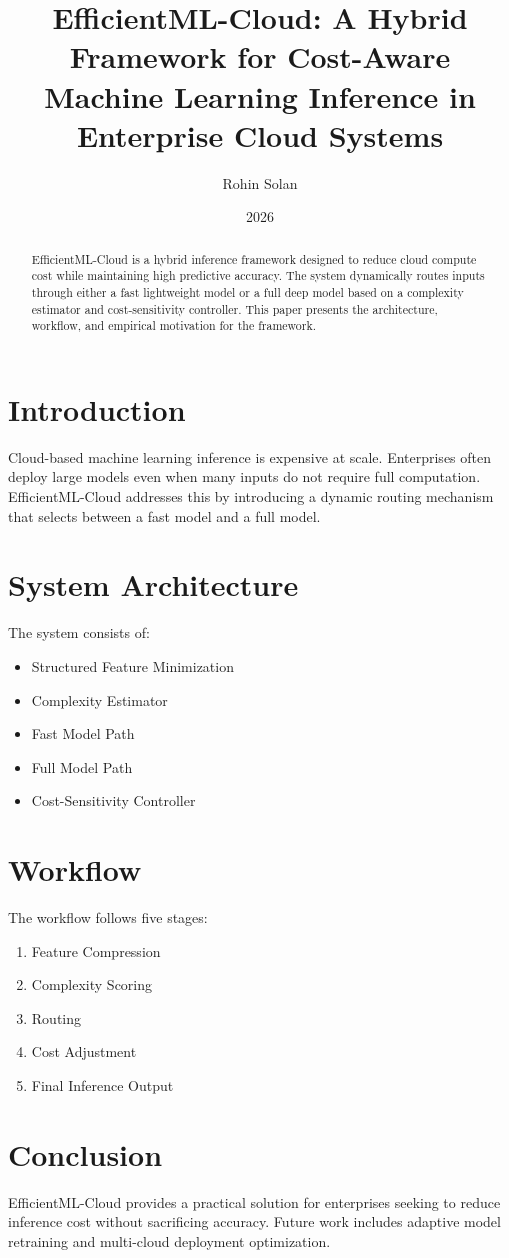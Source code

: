 \documentclass[12pt]{article}
\title{EfficientML-Cloud: A Hybrid Framework for Cost-Aware Machine Learning Inference in Enterprise Cloud Systems}
\author{Rohin Solan}
\date{2026}
\begin{document}
\maketitle

\begin{abstract}
EfficientML-Cloud is a hybrid inference framework designed to reduce cloud compute cost while maintaining high predictive accuracy. The system dynamically routes inputs through either a fast lightweight model or a full deep model based on a complexity estimator and cost-sensitivity controller. This paper presents the architecture, workflow, and empirical motivation for the framework.
\end{abstract}

\section{Introduction}
Cloud-based machine learning inference is expensive at scale. Enterprises often deploy large models even when many inputs do not require full computation. EfficientML-Cloud addresses this by introducing a dynamic routing mechanism that selects between a fast model and a full model.

\section{System Architecture}
The system consists of:
\begin{itemize}
    \item Structured Feature Minimization
    \item Complexity Estimator
    \item Fast Model Path
    \item Full Model Path
    \item Cost-Sensitivity Controller
\end{itemize}



\section{Workflow}
The workflow follows five stages:
\begin{enumerate}
    \item Feature Compression
    \item Complexity Scoring
    \item Routing
    \item Cost Adjustment
    \item Final Inference Output
\end{enumerate}

\section{Conclusion}
EfficientML-Cloud provides a practical solution for enterprises seeking to reduce inference cost without sacrificing accuracy. Future work includes adaptive model retraining and multi-cloud deployment optimization.



\end{document}

